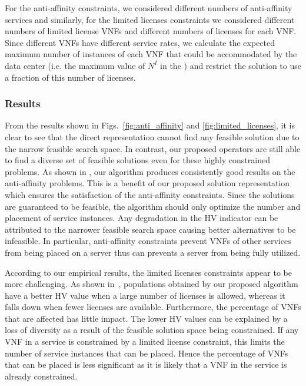 For the anti-affinity constraints, we considered different numbers of anti-affinity services and similarly, for the limited licenses constraints we considered different numbers of limited license VNFs and different numbers of licenses for each VNF. Since different VNFs have different service rates, we calculate the expected maximum number of instances of each VNF that could be accommodated by the data center (i.e. the maximum value of $N^I$ in the ) and restrict the solution to use a fraction of this number of licenses.

\subsubsection{Results}
From the results shown in Figs.~\ref{fig:anti_affinity} and \ref{fig:limited_licenses}, it is clear to see that the direct representation cannot find any feasible solution due to the narrow feasible search space. In contrast, our proposed operators are still able to find a diverse set of feasible solutions even for these highly constrained problems. As shown in , our algorithm produces consistently good results on the anti-affinity problems. This is a benefit of our proposed solution representation which ensures the satisfaction of the anti-affinity constraints. Since the solutions are guaranteed to be feasible, the algorithm should only optimize the number and placement of service instances. Any degradation in the HV indicator can be attributed to the narrower feasible search space causing better alternatives to be infeasible. In particular, anti-affinity constraints prevent VNFs of other services from being placed on a server thus can prevents a server from being fully utilized.

According to our empirical results, the limited licenses constraints appear to be more challenging. As shown in~, populations obtained by our proposed algorithm have a better HV value when a large number of licenses is allowed, whereas it falls down when fewer licenses are available. Furthermore, the percentage of VNFs that are affected has little impact. The lower HV values can be explained by a loss of diversity as a result of the feasible solution space being constrained. If any VNF in a service is constrained by a limited license constraint, this limits the number of service instances that can be placed. Hence the percentage of VNFs that can be placed is less significant as it is likely that a VNF in the service is already constrained.

